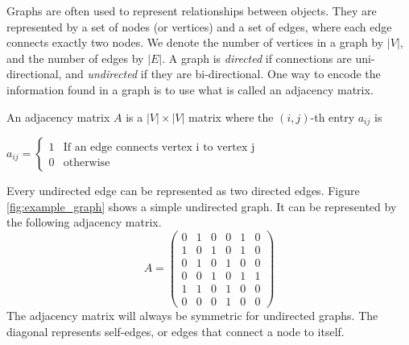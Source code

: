 Graphs are often used to represent relationships between objects.
They are represented by a set of nodes (or vertices) and a set of edges, where each edge connects exactly two nodes.
We denote the number of vertices in a graph by $|V|$, and the number of edges by $|E|$.
A graph is \emph{directed} if connections are uni-directional, and \emph{undirected} if they are bi-directional.
One way to encode the information found in a graph is to use what is called an adjacency matrix.
\begin{definition} An adjacency matrix $A$ is a $|V| \times |V|$ matrix where the $(i,j)$-th entry $a_{ij}$ is
\begin{center}
	$a_{ij} = \begin{cases} 1 & \mbox{If an edge connects vertex i to vertex j} \\ 0 & \mbox{otherwise} \end{cases}$
\end{center}
\end{definition}

Every undirected edge can be represented as two directed edges.
Figure \ref{fig:example_graph} shows a simple undirected graph.
It can be represented by the following adjacency matrix.
\[
A = \begin{pmatrix}
0 & 1 & 0 & 0 & 1 & 0\\
1 & 0 & 1 & 0 & 1 & 0\\
0 & 1 & 0 & 1 & 0 & 0\\
0 & 0 & 1 & 0 & 1 & 1\\
1 & 1 & 0 & 1 & 0 & 0\\
0 & 0 & 0 & 1 & 0 & 0
\end{pmatrix}
\]
The adjacency matrix will always be symmetric for undirected graphs.
The diagonal represents self-edges, or edges that connect a node to itself.

